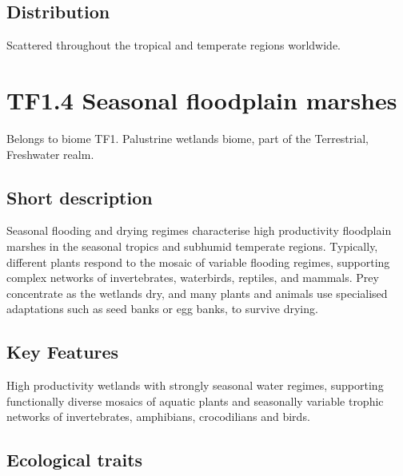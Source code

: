 \documentclass[
  letterpaper,
  DIV=11,
  numbers=noendperiod]{scrartcl}
\begin{document}
\subsection{Distribution}\label{distribution-105}

Scattered throughout the tropical and temperate regions worldwide.

\section{TF1.4 Seasonal floodplain
marshes}\label{tf1.4-seasonal-floodplain-marshes}

Belongs to biome TF1. Palustrine wetlands biome, part of the
Terrestrial, Freshwater realm.

\subsection{Short description}\label{short-description-106}

Seasonal flooding and drying regimes characterise high productivity
floodplain marshes in the seasonal tropics and subhumid temperate
regions. Typically, different plants respond to the mosaic of variable
flooding regimes, supporting complex networks of invertebrates,
waterbirds, reptiles, and mammals. Prey concentrate as the wetlands dry,
and many plants and animals use specialised adaptations such as seed
banks or egg banks, to survive drying.

\subsection{Key Features}\label{key-features-106}

High productivity wetlands with strongly seasonal water regimes,
supporting functionally diverse mosaics of aquatic plants and seasonally
variable trophic networks of invertebrates, amphibians, crocodilians and
birds.

\subsection{Ecological traits}\label{ecological-traits-106}
\end{document}
